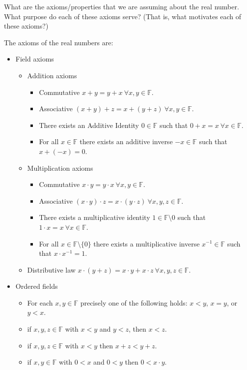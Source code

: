 \documentclass[12pt]{amsart}
\newcommand{\F}{\mathbb{F}}
\begin{document}
What are the axioms/properties that we are assuming about the real number. What
purpose do each of these axioms serve? (That is, what motivates each of these
axioms?)

The axioms of the real numbers are:
\begin{itemize}
  \item Field axioms
    \begin{itemize}
      \item Addition axioms
        \begin{itemize}
          \item Commutative $x+y=y+x\ \forall x,y\in\F$.
          \item Associative $(x+y)+z=x+(y+z)\ \forall x,y\in\F$.
          \item There exists an Additive Identity $0\in\F$ such that
            $0+x=x\ \forall x\in\F$.
          \item For all $x\in\F$ there exists an additive inverse $-x\in\F$
            such that $x+(-x)=0$.
        \end{itemize}
      \item Multiplication axioms
        \begin{itemize}
          \item Commutative $x\cdot y=y\cdot x\ \forall x,y\in\F$.
          \item Associative $(x\cdot y)\cdot z = x\cdot(y\cdot z)\ \forall
            x,y,z\in\F$.
          \item There exists a multiplicative identity $1\in\F\setminus{0}$
            such that $1\cdot x=x\ \forall x\in\F$.
          \item For all $x\in\F\setminus\{0\}$ there exists a multiplicative
            inverse $x^{-1}\in\F$ such that $x\cdot x^{-1}=1$.
        \end{itemize}
      \item Distributive law $x\cdot(y+z)=x\cdot y+x\cdot z\ \forall
        x,y,z\in\F$.
    \end{itemize}
  \item Ordered fields
    \begin{itemize}
      \item For each $x,y\in\F$ precisely one of the following holds: $x<y$,
        $x=y$, or $y<x$.
      \item if $x,y,z\in\F$ with $x<y$ and $y<z$, then $x<z$.
      \item if $x,y,z\in\F$ with $x<y$ then $x+z<y+z$.
      \item if $x,y\in\F$ with $0<x$ and $0<y$ then $0<x\cdot y$.

\end{itemize}
\end{itemize}
\end{document}
